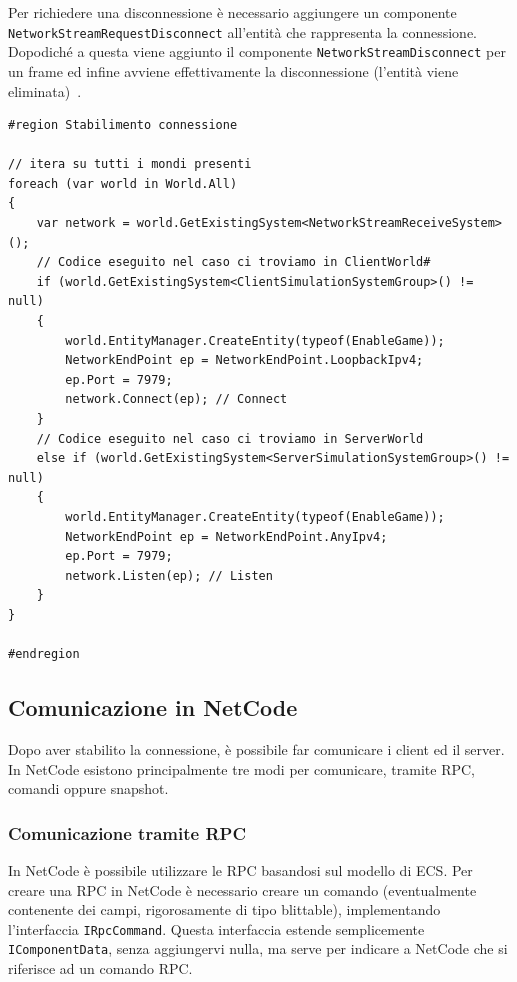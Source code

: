 Per richiedere una disconnessione è necessario aggiungere un componente \verb|NetworkStreamRequestDisconnect| all'entità che rappresenta la connessione. Dopodiché a questa viene aggiunto il componente \verb|NetworkStreamDisconnect| per un frame ed infine avviene effettivamente la disconnessione (l'entità viene eliminata)~\cite{youtube:unity-netcode}.

\begin{lstlisting}[caption={Prototipo: stabilimento della connessione.}, label={lst:example-connection},language={[Sharp]C}]
#region Stabilimento connessione

// itera su tutti i mondi presenti
foreach (var world in World.All) 
{
    var network = world.GetExistingSystem<NetworkStreamReceiveSystem>();
    // Codice eseguito nel caso ci troviamo in ClientWorld#
    if (world.GetExistingSystem<ClientSimulationSystemGroup>() != null) 
    {
        world.EntityManager.CreateEntity(typeof(EnableGame));
        NetworkEndPoint ep = NetworkEndPoint.LoopbackIpv4;
        ep.Port = 7979;
        network.Connect(ep); // Connect
    }
    // Codice eseguito nel caso ci troviamo in ServerWorld
    else if (world.GetExistingSystem<ServerSimulationSystemGroup>() != null) 
    {
        world.EntityManager.CreateEntity(typeof(EnableGame));
        NetworkEndPoint ep = NetworkEndPoint.AnyIpv4;
        ep.Port = 7979;
        network.Listen(ep); // Listen
    }
}

#endregion
\end{lstlisting}

\subsection{Comunicazione in NetCode}
Dopo aver stabilito la connessione, è possibile far comunicare i client ed il server. In NetCode esistono principalmente tre modi per comunicare, tramite RPC, comandi oppure snapshot.

\subsubsection{Comunicazione tramite RPC}
\label{subsubsec:comunicazione-rpc}
In NetCode è possibile utilizzare le RPC basandosi sul modello di ECS. Per creare una RPC in NetCode è necessario creare un comando (eventualmente contenente dei campi, rigorosamente di tipo blittable), implementando l'interfaccia \verb|IRpcCommand|. Questa interfaccia estende semplicemente \verb|IComponentData|, senza aggiungervi nulla, ma serve per indicare a NetCode che si riferisce ad un comando RPC.

